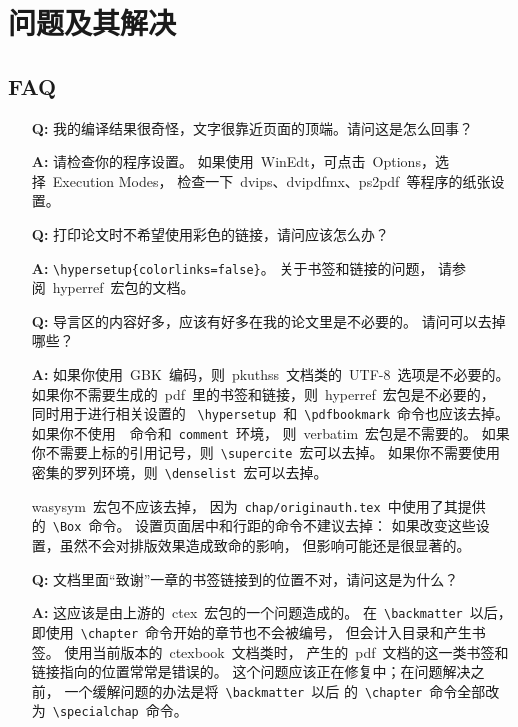 \chapter{问题及其解决}
	\section{FAQ\label{sec:faq}}
	\begin{enumerate}
		\item[\textbf{Q:}]
		我的编译结果很奇怪，文字很靠近页面的顶端。请问这是怎么回事？

		\item[\textbf{A:}]
		请检查你的程序设置。
		如果使用~WinEdt，可点击~Options，选择~Execution Modes，
		检查一下~dvips、dvipdfmx、ps2pdf~等程序的纸张设置。

		\item[\textbf{Q:}]
		打印论文时不希望使用彩色的链接，请问应该怎么办？

		\item[\textbf{A:}]
		\verb|\hypersetup{colorlinks=false}|。
		关于书签和链接的问题，
		请参阅~hyperref~宏包的文档\supercite{hyperref-doc}。

		\item[\textbf{Q:}]
		导言区的内容好多，应该有好多在我的论文里是不必要的。
		请问可以去掉哪些？

		\item[\textbf{A:}]
		如果你使用~GBK~编码，则~pkuthss~文档类的~UTF-8~选项是不必要的。
		如果你不需要生成的~pdf~里的书签和链接，则~hyperref~宏包是不必要的，
		同时用于进行相关设置的~%
		\verb|\hypersetup|~和~\verb|\pdfbookmark|~命令也应该去掉。
		如果你不使用~\verb||~命令和~\verb|comment|~环境，
		则~verbatim~宏包是不需要的。
		如果你不需要上标的引用记号，则~\verb|\supercite|~宏可以去掉。
		如果你不需要使用密集的罗列环境，则~\verb|\denselist|~宏可以去掉。

		wasysym~宏包不应该去掉，
		因为~\verb|chap/originauth.tex|~中使用了其提供的~\verb|\Box|~命令。
		设置页面居中和行距的命令不建议去掉：
		如果改变这些设置，虽然不会对排版效果造成致命的影响，
		但影响可能还是很显著的。

		\item[\textbf{Q:}]
		文档里面“致谢”一章的书签链接到的位置不对，请问这是为什么？

		\item[\textbf{A:}]
		这应该是由上游的~ctex~宏包的一个问题造成的。
		在~\verb|\backmatter|~以后，
		即使用~\verb|\chapter|~命令开始的章节也不会被编号，
		但会计入目录和产生书签。
		使用当前版本的~ctexbook~文档类时，
		产生的~pdf~文档的这一类书签和链接指向的位置常常是错误的。
		这个问题应该正在修复中；在问题解决之前，
		一个缓解问题的办法是将~\verb|\backmatter|~以后%
		的~\verb|\chapter|~命令全部改为~\verb|\specialchap|~命令。
	\end{enumerate}

